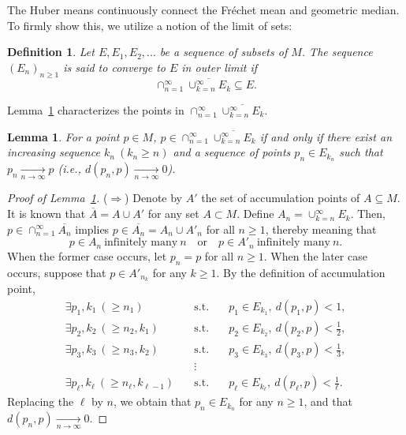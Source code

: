 \documentclass[preprint]{imsart}
\theoremstyle{plain}
\newtheorem{lemma}{Lemma}
\newtheorem{definition}{Definition}
\theoremstyle{remark}
\begin{document}
\begin{appendix}
The Huber means continuously connect the Fr\'{e}chet mean and geometric median. To firmly show this, we utilize a notion of the limit of sets:
\begin{definition}\label{def_outer_limit}
Let $E, E_{1}, E_{2}, ...$ be a sequence of subsets of $M$. The sequence $(E_{n})_{n \ge 1}$ is said to converge to $E$ in \textit{outer limit} if
\[
\cap_{n=1}^{\infty}\overline{\cup_{k=n}^{\infty}E_{k}} \subseteq E.
\]
\end{definition}


Lemma~\ref{lem:subseq} characterizes the points in $\cap_{n=1}^{\infty}\overline{\cup_{k=n}^{\infty}E_{k}}$.
\begin{lemma}\label{lem:subseq}
For a point $p \in M$, $p \in \cap_{n=1}^{\infty}\overline{\cup_{k=n}^{\infty}E_{k}}$ if and only if there exist an increasing sequence $k_{n} ~ (k_{n} \ge n)$ and a sequence of points $p_{n} \in E_{k_{n}}$ such that $p_{n} \underset{n \rightarrow \infty}{\rightarrow} p$ (i.e., $d(p_{n}, p) \underset{n \rightarrow \infty}{\rightarrow} 0$).
\end{lemma}
\begin{proof}[Proof of Lemma~\ref{lem:subseq}]
($\Rightarrow$) Denote by $A'$ the set of accumulation points of $A \subseteq M$. It is known that $\overline{A}=A \cup A'$ for any set $A \subset M$. Define $A_{n}=\cup_{k=n}^{\infty}E_k$. Then, $p \in \cap_{n=1}^{\infty}\overline{A_{n}}$ implies $p \in \overline{A_{n}}=A_{n} \cup A'_{n}$ for all $n\ge 1$, thereby meaning that
\[
p \in A_{n} ~ \mbox{infinitely many} ~ n \quad \mbox{or} \quad p \in A'_{n} ~ \mbox{infinitely many}~ n.
\]
When the former case occurs, let $p_{n}=p$ for all $n \ge 1$. When the later case occurs, suppose that $p \in A'_{n_{k}}$ for any $k \ge 1$. By the definition of accumulation point,
\begin{eqnarray*}
\exists p_{1}, k_{1}~(\ge n_1) \quad &\mbox{s.t.}& \quad p_1 \in E_{k_1},~ d(p_1,p)<1, \\
\exists p_{2}, k_{2}~(\ge n_2, k_1) \quad &\mbox{s.t.}& \quad p_2 \in E_{k_2}, ~ d(p_2,p)<\frac{1}{2}, \\
\exists p_{3}, k_{3}~(\ge n_3, k_2) \quad &\mbox{s.t.}& \quad p_3 \in E_{k_3}, ~ d(p_3,p)<\frac{1}{3}, \\
&\vdots& \\
\exists p_{\ell}, k_{\ell}~(\ge n_\ell, k_{\ell-1}) \quad &\mbox{s.t.}& \quad p_\ell \in E_{k_\ell}, ~ d(p_\ell,p)<\frac{1}{\ell}.
\end{eqnarray*}
Replacing the $\ell$ by $n$, we obtain that $p_{n} \in E_{k_{n}}$ for any $n \ge 1$, and that $d(p_{n}, p) \underset{n \rightarrow \infty}{\rightarrow} 0$.  


\end{proof}
\end{appendix}
\end{document}
